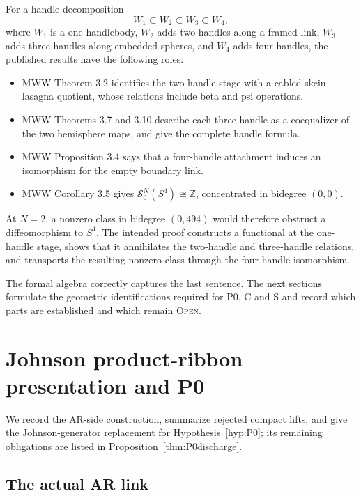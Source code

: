 \documentclass[11pt]{amsart}
\theoremstyle{definition}
\theoremstyle{remark}
\newcommand{\Z}{\mathbb{Z}}
\newcommand{\SN}{\mathcal{S}^{N}_{0}}
\newcommand{\Open}{\textnormal{\textsc{Open}}}
\begin{document}
For a handle decomposition
\[
W_1\subset W_2\subset W_3\subset W_4,
\]
where $W_1$ is a one-handlebody, $W_2$ adds two-handles along a framed link,
$W_3$ adds three-handles along embedded spheres, and $W_4$ adds four-handles,
the published results have the following roles.
\begin{itemize}
\item MWW Theorem 3.2 identifies the two-handle stage with a cabled skein
lasagna quotient, whose relations include beta and psi operations.
\item MWW Theorems 3.7 and 3.10 describe each three-handle as a coequalizer
of the two hemisphere maps, and give the complete handle formula.
\item MWW Proposition 3.4 says that a four-handle attachment induces an
isomorphism for the empty boundary link.
\item MWW Corollary 3.5 gives
$\SN(S^4)\cong\Z$, concentrated in bidegree $(0,0)$.
\end{itemize}

At $N=2$, a nonzero class in bidegree $(0,494)$ would therefore obstruct a
diffeomorphism to $S^4$.  The intended proof constructs a functional at the
one-handle stage, shows that it annihilates the two-handle and three-handle
relations, and transports the resulting nonzero class through the
four-handle isomorphism.

The formal algebra correctly captures the last sentence.  The next sections
formulate the geometric identifications required for P0, C and S and record
which parts are established and which remain \Open.

\section{Johnson product-ribbon presentation and P0}\label{sec:johnson-presentation}

We record the AR-side construction, summarize rejected compact lifts, and
give the Johnson-generator replacement for Hypothesis~\ref{hyp:P0}; its
remaining obligations are listed in Proposition~\ref{thm:P0discharge}.

\subsection{The actual AR link}
\end{document}
